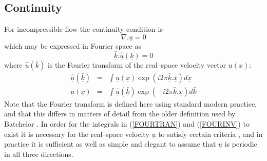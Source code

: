 \documentclass[dvips]{article}
\begin{document}
\subsection{Continuity}
For incompressible flow the continuity condition is
\begin{equation}
\nabla . \underline{u} = 0
\label{CONTPHYS}
\end{equation}
which may be expressed in Fourier space as
\begin{equation}
\underline{\bar{k}}.\underline{\hat{u}}(\underline{k}) = 0
\label{CONTFOUR}
\end{equation}
where $\underline{\hat{u}}(\underline{\bar{k}})$ is the Fourier transform of the
real--space velocity vector $\underline{u}(\underline{x})$:
\begin{eqnarray}
\underline{\hat{u}}(\underline{\bar{k}}) & = & \int \underline{u}(\underline{x})
\exp{(i2\pi\underline{\bar{k}}.\underline{x})} d\underline{x}
\label{FOURTRAN}\\
\underline{u}(\underline{x}) & = & \int
\underline{\hat{u}}(\underline{\bar{k}})
\exp{(-i2\pi\underline{\bar{k}}.\underline{x})} d\underline{\bar{k}}
\label{FOURINV}
\end{eqnarray}
Note that the Fourier transform is defined here using standard modern
practice, and that this differs in matters of detail from the
older definition used by Batchelor \cite{batchelor53}.
In order for the integrals in (\ref{FOURTRAN}) and (\ref{FOURINV})
to exist it is necessary for the real--space velocity $\underline{u}$
to satisfy certain criteria \cite{batchelor53}, and in practice it is
sufficient as
well as simple and elegant to assume that $\underline{u}$ is
periodic in all three directions.
\end{document}
